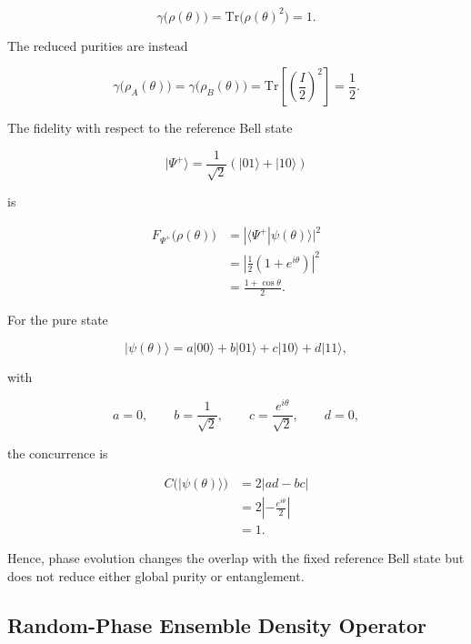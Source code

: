 \begin{equation}
\gamma\big(\rho(\theta)\big)
=
\mathrm{Tr}\big(\rho(\theta)^2\big)
=
1.
\label{eq:d5_phase_shifted_global_purity}
\end{equation}

The reduced purities are instead

\begin{equation}
\gamma\big(\rho_A(\theta)\big)
=
\gamma\big(\rho_B(\theta)\big)
=
\mathrm{Tr}\left[\left(\frac{I}{2}\right)^2\right]
=
\frac{1}{2}.
\label{eq:d5_phase_shifted_reduced_purity}
\end{equation}

The fidelity with respect to the reference Bell state

\[
|\Psi^+\rangle
=
\frac{1}{\sqrt{2}}
\left(
|01\rangle + |10\rangle
\right)
\]

is

\begin{align}
F_{\Psi^+}\big(\rho(\theta)\big)
&=
|\langle\Psi^+|\psi(\theta)\rangle|^2
\nonumber
\\
&=
\left|
\frac{1}{2}
\left(
1+e^{i\theta}
\right)
\right|^2
\nonumber
\\
&=
\frac{1+\cos\theta}{2}.
\label{eq:d5_phase_shifted_fidelity}
\end{align}

For the pure state

\[
|\psi(\theta)\rangle
=
a|00\rangle+b|01\rangle+c|10\rangle+d|11\rangle,
\]

with

\[
a=0,
\qquad
b=\frac{1}{\sqrt{2}},
\qquad
c=\frac{e^{i\theta}}{\sqrt{2}},
\qquad
d=0,
\]

the concurrence is

\begin{align}
C\big(|\psi(\theta)\rangle\big)
&=
2|ad-bc|
\nonumber
\\
&=
2\left|-
\frac{e^{i\theta}}{2}
\right|
\nonumber
\\
&=
1.
\label{eq:d5_phase_shifted_concurrence}
\end{align}

Hence, phase evolution changes the overlap with the fixed reference Bell state but does not reduce either global purity or entanglement.


\subsection{Random-Phase Ensemble Density Operator}

